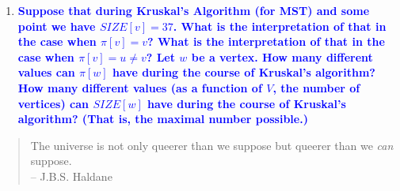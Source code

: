 \documentclass[11pt]{article}
\begin{document}
\begin{enumerate}
\item \textbf{\textcolor{blue}{Suppose that during Kruskal's Algorithm (for MST) and some point we have $SIZE[v]=37$. What is the interpretation of that in the case when $\pi[v]=v$? What is the interpretation of that in the case when $\pi[v]=u\neq v$? Let $w$ be a vertex. How many different values can $\pi[w]$ have during the course of Kruskal's algorithm? How many different values (as a function of $V$, the number of vertices) can $SIZE[w]$ have during the course of Kruskal's algorithm? (That is, the maximal number possible.)}}

\end{enumerate}

\begin{quote}
The universe is not only queerer than we suppose but queerer than we {\em can}
suppose.  \\ -- J.B.S. Haldane
\end{quote}
\end{document}
